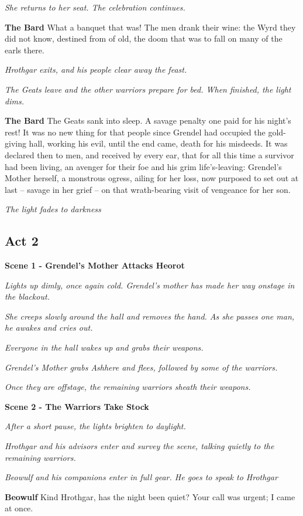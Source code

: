 \documentclass[a4paper]{article}
\begin{document}
{\centerline{\textit{She returns to her seat. The celebration continues.}}

\textbf{The Bard} What a banquet that was!
The men drank their wine: the Wyrd they did not know,
destined from of old, the doom that was to fall
on many of the earls there.

\centerline{\textit{Hrothgar exits, and his people clear away the feast.}}
\centerline{\textit{The Geats leave and the other warriors prepare for bed. When finished, the light dims.}}

\textbf{The Bard} The Geats sank into sleep. A savage penalty
one paid for his night’s rest! It was no new thing for that people
since Grendel had occupied the gold-giving hall,
working his evil, until the end came,
death for his misdeeds. It was declared then to men,
and received by every ear, that for all this time
a survivor had been living, an avenger for their foe
and his grim life’s-leaving: Grendel’s Mother herself,
a monstrous ogress, ailing for her loss,
now purposed to set out at last – savage in her grief –
on that wrath-bearing visit of vengeance for her son.

\centerline{\textit{The light fades to darkness}}

\subsection{Act 2}%

\centerline{\textbf{Scene 1 - Grendel's Mother Attacks Heorot}}
\centerline{\textit{Lights up dimly, once again cold. Grendel's mother has made her way onstage in the blackout.}}
\centerline{\textit{She creeps slowly around the hall and removes the hand. As she passes one man, he awakes and cries out.}}
\centerline{\textit{Everyone in the hall wakes up and grabs their weapons.}}
\centerline{\textit{Grendel's Mother grabs Ashhere and flees, followed by some of the warriors.}}
\centerline{\textit{Once they are offstage, the remaining warriors sheath their weapons.}}

\centerline{\textbf{Scene 2 - The Warriors Take Stock}}
\centerline{\textit{After a short pause, the lights brighten to daylight.}}
\centerline{\textit{Hrothgar and his advisors enter and survey the scene, talking quietly to the remaining warriors.}}
\centerline{\textit{Beowulf and his companions enter in full gear. He goes to speak to Hrothgar}}

\textbf{Beowulf} Kind Hrothgar, has the night been quiet?
Your call was urgent; I came at once. 

}
\end{document}
